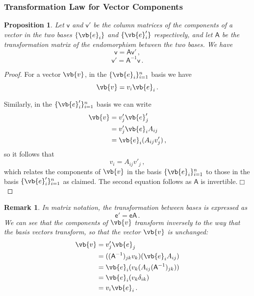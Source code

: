 \documentclass{article}
\theoremstyle{plain}\theoremheaderfont{\normalfont\itshape}\theorembodyfont{\rmfamily}\theoremseparator{.}\newtheorem*{rem}{Remark}\newtheorem*{ex}{Example}\newtheorem*{proof}{Proof}\newtheorem*{altp}{Alternative proof}
\theoremstyle{plain}\theoremheaderfont{\normalfont\bfseries}\theorembodyfont{\rmfamily}\theoremseparator{.}\newtheorem{thm}{Theorem}[section]\newtheorem{lem}[thm]{Lemma}\newtheorem{prop}[thm]{Proposition}\newtheorem*{cor}{Corollary}\newtheorem{defn}[thm]{Definition}\newtheorem{clm}[thm]{Claim}\newtheorem{clminproof}{Claim}
\theoremstyle{break}\theoremheaderfont{\normalfont\itshape}\theorembodyfont{\rmfamily}\theoremseparator{.\medskip}\newtheorem*{proofskip}{Proof}\newtheorem*{exs}{Examples}\newtheorem*{rems}{Remarks}
\theoremstyle{break}\theoremheaderfont{\normalfont\bfseries}\theorembodyfont{\rmfamily}\theoremseparator{.\medskip}\newtheorem{lemskip}[thm]{Lemma}\newtheorem{defnskip}[thm]{Definition}\newtheorem{propskip}[thm]{Proposition}\newtheorem{thmskip}[thm]{Theorem}
\numberwithin{equation}{section}
\newcommand{\qed}{\hfill\ensuremath{\Box}}
\begin{document}
	\subsubsection{Transformation Law for Vector Components}
	\begin{prop}
		Let \(\mathsf{v}\) and \(\mathsf{v}'\) be the column matrices of the components of a vector in the two bases \(\{\vb{e}_i\}\) and \(\{\vb{e}_i'\}\) respectively, and let \(\mathsf{A}\) be the transformation matrix of the endomorphism between the two bases. We have
		\[\mathsf{v}=\mathsf{Av'}\,,\]
		\[\mathsf{v}'=\mathsf{A}^{-1}\mathsf{v}\,.\]
	\end{prop}
	\begin{proof}
		For a vector \(\vb{v}\), in the \(\{\vb{e}_i\}_{i=1}^n\) basis we have
		\[\vb{v}=v_i\vb{e}_i\,.\]
		
		Similarly, in the \(\{\vb{e}'_i\}_{i=1}^n\) basis we can write
		\begin{align*}
			\vb{v}&=v'_j\vb{e}'_j\\
			&=v'_j\vb{e}_iA_{ij}\\
			&=\vb{e}_i(A_{ij}v'_j)\,,
		\end{align*}
		so it follows that
		\[v_i=A_{ij}v'_j\,,\]
		which relates the components of \(\vb{v}\) in the basis \(\{\vb{e}_i\}_{i=1}^n\) to those in the basis \(\{\vb{e}'_i\}_{i=1}^n\) as claimed. The second equation follows as \(\mathsf{A}\) is invertible.\qed
	\end{proof}
	
	\begin{rem}
		In matrix notation, the transformation between bases is expressed as
		\[\mathsf{e'=eA}\,.\]
		We can see that the components of \(\vb{v}\) transform inversely to the way that the basis vectors transform, so that the vector \(\vb{v}\) is unchanged:
		\begin{align*}
			\vb{v}&=v'_j\vb{e}_j\\
			&=((\mathsf{A}^{-1})_{jk}v_k)(\vb{e}_iA_{ij})\\
			&=\vb{e}_i(v_k(A_{ij}(\mathsf{A}^{-1})_{jk}))\\
			&=\vb{e}_i(v_k\delta_{ik})\\
			&=v_i\vb{e}_i\,.
		\end{align*}
	\end{rem}
\end{document}
